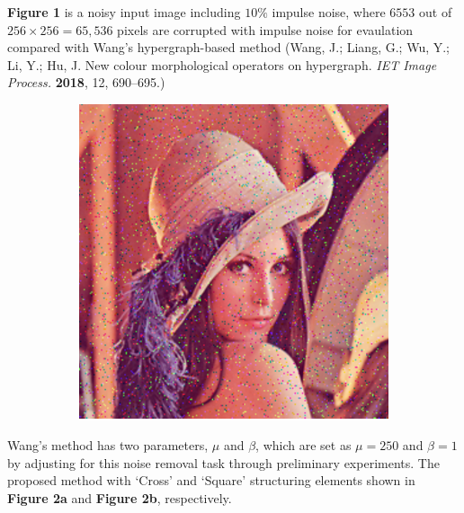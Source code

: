 \textbf{Figure 1} is a noisy input image including $10\% $ impulse noise, where $6553$ out of $256×256=65,536$ pixels are corrupted with impulse noise for evaulation compared with Wang’s hypergraph-based method (Wang, J.; Liang, G.; Wu, Y.; Li, Y.; Hu, J. New colour morphological operators on hypergraph. \textit{IET Image Process.} \textbf{2018}, 12, 690–695.)
\begin{figure}[H]
    \label{img:figure6}
    \centering
    \begin{subfigure}[t]{.4\textwidth}
    \includegraphics[width=0.9\linewidth]{images/result/figure6.png}
    \centering
    \end{subfigure}
    \caption{}
\end{figure}

Wang’s method has two parameters, $\mu$ and $\beta$, which are set as $\mu = 250$ and $\beta = 1$ by adjusting for this noise removal task through preliminary experiments. The proposed method with ‘Cross’ and ‘Square’ structuring elements shown in \textbf{Figure 2a} and \textbf{Figure 2b}, respectively.


